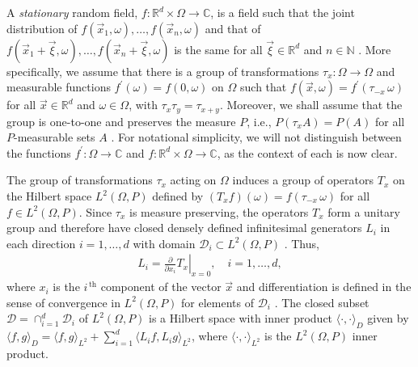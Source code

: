 \documentclass{cmslatex}
\begin{document}
A \emph{stationary} random field, $f:\mathbb{R}^d\times\Omega\to\mathbb{C}$, is a
field such that the  
joint distribution of $f(\vec{x}_1,\omega),\ldots,f(\vec{x}_n,\omega)$ and that of
$f(\vec{x}_1+\vec{\xi},\omega),\ldots,f(\vec{x}_n+\vec{\xi},\omega)$ is the same for all
$\vec{\xi}\in\mathbb{R}^d$ and $n\in\mathbb{N}$
\cite{Golden:CMP-473,Papanicolaou:RF-835}.
More specifically, we assume that there is a group of transformations
$\tau_x:\Omega\to\Omega$ and measurable functions $f^{\prime}(\omega)=f(0,\omega)$ on $\Omega$ such that
$f(\vec{x},\omega)=f^\prime(\tau_{-x}\,\omega)$ for all $\vec{x}\in\mathbb{R}^d$ and
$\omega\in\Omega$, with $\tau_x\tau_y=\tau_{x+y}$.  Moreover, we shall assume that the
group is one-to-one and preserves the measure $P$, i.e., $P(\tau_xA)=P(A)$
for all $P$-measurable sets $A$
\cite{Golden:CMP-473,Papanicolaou:RF-835}. For notational simplicity,
we will not distinguish between the functions $f^\prime:\Omega\to\mathbb{C}$ and
$f:\mathbb{R}^d\times\Omega\to\mathbb{C}$, as the context of each is now
clear. 






The group of transformations $\tau_x$ acting on $\Omega$ induces a group of
operators $T_x$ on the Hilbert space $L^2(\Omega,P)$ defined by
$(T_xf)(\omega)=f(\tau_{-x}\,\omega)$ for all $f\in L^2(\Omega,P)$. Since $\tau_x$ is measure
preserving, the operators $T_x$ form a unitary group and therefore
have closed densely defined infinitesimal generators $L_i$ in each
direction $i=1,\ldots,d$ with domain $\mathscr{D}_i\subset L^2(\Omega,P)$
\cite{Golden:CMP-473,Papanicolaou:RF-835}. Thus,  
%
\begin{align}\label{eq:Li}
  L_i=\left.\frac{\partial}{\partial x_i}T_x \right|_{x=0}, \quad i=1,\ldots,d,
\end{align}
%
where $x_i$
is the $i^{\,\text{th}}$ component of the vector
$\vec{x}$ and differentiation is defined in the sense of convergence
in $L^2(\Omega,P)$ for elements of $\mathscr{D}_i$
\cite{Golden:CMP-473}. The closed subset
$\mathscr{D}=\cap_{i=1}^d\mathscr{D}_i$ of $L^2(\Omega,P)$ is a Hilbert space
\cite{Golden:CMP-473} with inner product $\langle \cdot,\cdot\rangle_D$ given by
$\langle f,g\rangle_D=\langle f,g\rangle_{L^2}+\sum_{i=1}^d\langle L_if,L_ig\rangle_{L^2}$, where
$\langle\cdot,\cdot\rangle_{L^2}$ is the $L^2(\Omega,P)$ inner product. 
\end{document}
